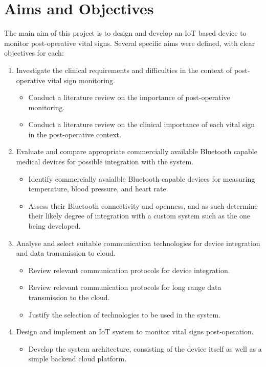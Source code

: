 \section{Aims and Objectives} %
The main aim of this project is to design and develop an IoT based device to monitor post-operative vital signs. Several specific aims were defined, with clear objectives for each:
\begin{enumerate}
	\item Investigate the clinical requirements and difficulties in the context of post-operative vital sign monitoring.
	\begin{itemize}
		\item Conduct a literature review on the importance of post-operative monitoring.
		\item Conduct a literature review on the clinical importance of each vital sign in the post-operative context.
	\end{itemize}
	\item Evaluate and compare appropriate commercially available Bluetooth capable medical devices for possible integration with the system.
	\begin{itemize}
		\item Identify commercially avaialble Bluetooth capable devices for measuring temperature, blood pressure, and heart rate.
		\item Assess their Bluetooth connectivity and openness, and as such determine their likely degree of integration with a custom system such as the one being developed.
	\end{itemize}
	\item Analyse and select suitable communication technologies for device integration and data transmission to cloud.
	\begin{itemize}
		\item Review relevant communication protocols for device integration.
		\item Review relevant communication protocols for long range data transmission to the cloud.
		\item Justify the selection of technologies to be used in the system.
	\end{itemize}
	\item Design and implement an IoT system to monitor vital signs post-operation.
	\begin{itemize}
		\item Develop the system architecture, consisting of the device itself as well as a simple backend cloud platform.

\end{itemize}
\end{enumerate}
